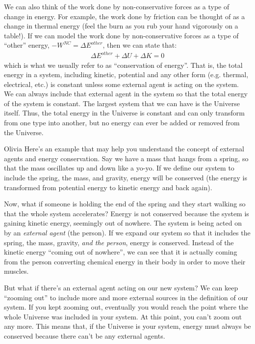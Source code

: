 We can also think of the work done by non-conservative forces as a type of change in energy. For example, the work done by friction can be thought of as a change in thermal energy (feel the burn as you rub your hand vigorously on a table!). If we can model the work done by non-conservative forces as a type of ``other'' energy, $-W^{NC}=\Delta E^{other}$, then we can state that:
\begin{align*}
\Delta E^{other} + \Delta U + \Delta K =0
\end{align*}
which is what we usually refer to as ``conservation of energy''. That is, the total energy in a system, including kinetic, potential and any other form (e.g. thermal, electrical, etc.) is constant unless some external agent is acting on the system. \\

We can always include that external agent in the system so that the total energy of the system is constant. The largest system that we can have is the Universe itself. Thus, the total energy in the Universe is constant and can only transform from one type into another, but no energy can ever be added or removed from the Universe.

\begin{studentOpinion}{Olivia}
Here's an example that may help you understand the concept of external agents and energy conservation. Say we have a mass that hangs from a spring, so that the mass oscillates up and down like a yo-yo. If we define our system to include the spring, the mass, and gravity, energy will be conserved (the energy is transformed from potential energy to kinetic energy and back again). 

Now, what if someone is holding the end of the spring and they start walking so that the whole system accelerates? Energy is not conserved because the system is gaining kinetic energy, seemingly out of nowhere. The system is being acted on by an \textit{external agent} (the person). If we expand our system so that it includes the spring, the mass, gravity, \textit{and the person}, energy is conserved. Instead of the kinetic energy ``coming out of nowhere'', we can see that it is actually coming from the person converting chemical energy in their body in order to move their muscles.

But what if there's an external agent acting on our new system? We can keep ``zooming out'' to include more and more external sources in the definition of our system. If you kept zooming out, eventually you would reach the point where the whole Universe was included in your system. At this point, you can't zoom out any more. This means that, if the Universe is your system, energy must always be conserved because there can't be any external agents. 
\end{studentOpinion}



